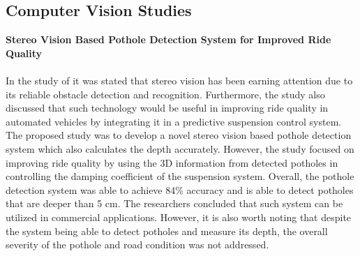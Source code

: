 \subsection{Computer Vision Studies}

\noindent\textbf{\large Stereo Vision Based Pothole Detection System for Improved Ride Quality} \\\\
In the study of  it was stated that stereo vision has been earning attention due to its reliable obstacle detection and recognition. Furthermore, the study also discussed that such technology would be useful in improving ride quality in automated vehicles by integrating it in a predictive suspension control system. The proposed study was to develop a novel stereo vision based pothole detection system which also calculates the depth accurately. However, the study focused on improving ride quality by using the 3D information from detected potholes in controlling the damping coefficient of the suspension system. Overall, the pothole detection system was able to achieve 84\% accuracy and is able to detect potholes that are deeper than 5 cm. The researchers concluded that such system can be utilized in commercial applications. However, it is also worth noting that despite the system being able to detect potholes and measure its depth, the overall severity of the pothole and road condition was not addressed.

\newpage
